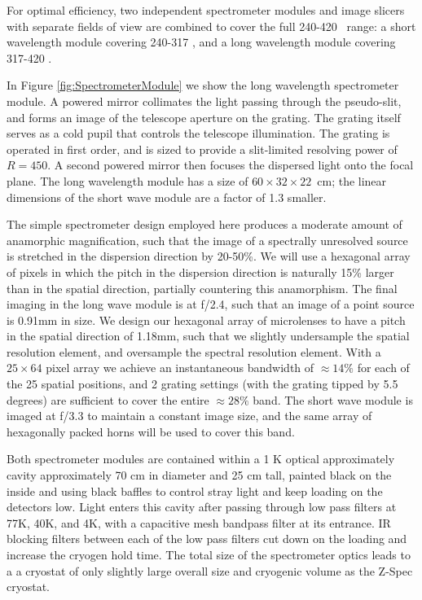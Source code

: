 For optimal efficiency, two independent spectrometer modules and image slicers with separate fields of view are combined to cover the full 240-420 \mum\ range: a short wavelength module covering 240-317 \mum, and a long wavelength module covering 317-420 \mum. 

In Figure \ref{fig:SpectrometerModule} we show the long wavelength spectrometer module. A powered mirror collimates the light passing through the pseudo-slit, and forms an image of the telescope aperture on the grating. The grating itself serves as a cold pupil that controls the telescope illumination. The grating is
operated in first order, and is sized to provide a slit-limited resolving power of $R=450$. A second powered mirror then focuses the dispersed light onto the focal plane. The long wavelength module has a size of $60 \times 32 \times 22$~cm; the linear dimensions of the short wave module are a factor of 1.3 smaller.

The simple spectrometer design employed here produces a moderate amount of
anamorphic magnification, such that the image of a spectrally unresolved
source is stretched in the dispersion direction by 20-50\%. We will use a
hexagonal array of pixels in which the pitch in the dispersion direction
is naturally 15\% larger than in the spatial direction, partially
countering this anamorphism. The final imaging in the long wave module is
at f/2.4, such that an image of a point source is 0.91mm in size. We
design our hexagonal array of microlenses to have a pitch in the spatial
direction of 1.18mm, such that we slightly undersample the spatial
resolution element, and oversample the spectral resolution element. With a
$25\times64$ pixel array we achieve an instantaneous bandwidth of $\approx$$14\%$
for each of the 25 spatial positions, and 2 grating settings (with the
grating tipped by 5.5 degrees) are sufficient to cover the entire
$\approx$$28\%$ band. The short wave module is imaged at f/3.3 to maintain
a constant image size, and the same array of hexagonally packed horns
will be used to cover this band.
 
Both spectrometer modules are contained within a 1 K optical approximately cavity approximately 70 cm in diameter and 25 cm tall, painted black on the inside and using black baffles to control stray light and keep loading on the detectors low. Light enters this cavity after passing through low pass filters at 77K, 40K, and 4K, with a capacitive mesh bandpass filter at its entrance.  IR blocking
filters between each of the low pass filters cut down on the loading
and increase the cryogen hold time.  The total size of the spectrometer optics leads to a a cryostat of only slightly large overall size and cryogenic volume as the Z-Spec cryostat.
 
